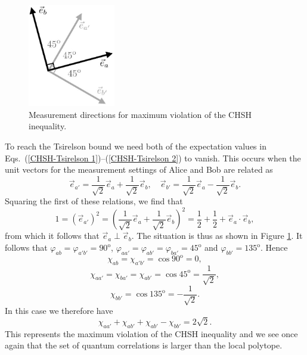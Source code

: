 \begin{figure}[ht]
\centering
    \includegraphics[width=1.5in]{vectorsCHSH.jpeg}
 \caption{Measurement directions for maximum violation of the CHSH inequality.}
   \label{vectorsCHSH}
\end{figure}

To reach the Tsirelson bound we need both of the expectation values in Eqs.\ (\ref{CHSH-Tsirelson 1})--(\ref{CHSH-Tsirelson 2}) to vanish. This occurs when the unit vectors for the measurement settings of Alice and Bob are related as 
\begin{equation}
\vec{e}_{a'}=\frac{1}{\sqrt{2}}\vec{e}_a+\frac{1}{\sqrt{2}}\vec{e}_b,\quad \vec{e}_{b'}= \frac{1}{\sqrt{2}}\vec{e}_a- \frac{1}{\sqrt{2}}\vec{e}_b. 
\end{equation}
Squaring the first of these relations, we find that
\begin{equation}
1 = \left( \vec{e}_{a'} \right)^2 = \left( \frac{1}{\sqrt{2}}\vec{e}_a+\frac{1}{\sqrt{2}}\vec{e}_b \right)^2 = \frac12 + \frac12 + \vec{e}_{a} \! \cdot \vec{e}_{b},
\end{equation}
from which it follows that $\vec{e}_{a} \perp \vec{e}_{b}$. The situation is thus as shown in Figure \ref{vectorsCHSH}. It follows that $\varphi_{ab} =  \varphi_{a'b'} = 90^{\mathrm{o}}$, $\varphi_{aa'} =  \varphi_{ab'} = \varphi_{ba'} = 45^{\mathrm{o}}$ and $\varphi_{bb'} =  135^{\mathrm{o}}$. Hence
\begin{equation*}
\chi_{ab}=\chi_{a'b'}= \cos{90^{\mathrm{o}}} = 0,
\end{equation*}
\begin{equation}
\chi_{aa'}=\chi_{ba'}=\chi_{ab'}= \cos{45^{\mathrm{o}}} = \frac{1}{\sqrt{2}},
\end{equation}
\begin{equation*}
\chi_{bb'}= \cos{135^{\mathrm{o}}} = - \frac{1}{\sqrt{2}}.
\end{equation*}
In this case we therefore have
\begin{equation}
\chi_{aa'}+\chi_{ab'}+\chi_{ab'}-\chi_{bb'} =2\sqrt{2}.
\label{CHSH-Tsirelson 5}
\end{equation}
This represents the maximum violation of the CHSH inequality and we see once again that the set of quantum correlations is larger than the local polytope.

